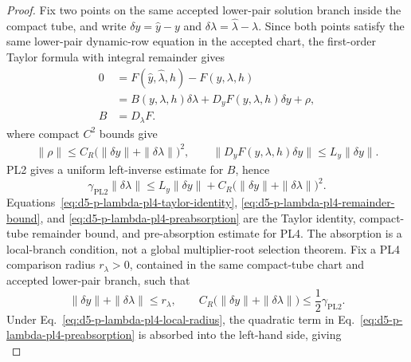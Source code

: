\documentclass[preprint,12pt]{elsarticle}
\begin{document}
\begin{proof}
Fix two points on the same accepted lower-pair solution branch inside the
compact tube, and write
\(\delta y=\widehat y-y\) and
\(\delta\lambda=\widehat\lambda-\lambda\).  Since both points satisfy the
same lower-pair dynamic-row equation in the accepted chart, the first-order
Taylor formula with integral remainder gives
\begin{equation}
\label{eq:d5-p-lambda-pl4-taylor-identity}
\begin{aligned}
  0
  &=F(\widehat y,\widehat\lambda,h)-F(y,\lambda,h)\\
  &=B(y,\lambda,h)\delta\lambda
    +D_yF(y,\lambda,h)\delta y+\rho,\\
  B&=D_{\lambda}F .
\end{aligned}
\end{equation}
where compact \(C^2\) bounds give
\begin{equation}
\label{eq:d5-p-lambda-pl4-remainder-bound}
\begin{aligned}
  \|\rho\|
  \le C_R\bigl(\|\delta y\|+\|\delta\lambda\|\bigr)^2,
  \qquad
  \|D_yF(y,\lambda,h)\delta y\|\le L_y\|\delta y\|.
\end{aligned}
\end{equation}
PL2 gives a uniform left-inverse estimate for \(B\), hence
\begin{equation}
\label{eq:d5-p-lambda-pl4-preabsorption}
  \gamma_{\mathrm{PL2}}\|\delta\lambda\|
  \le L_y\|\delta y\|
     +C_R\bigl(\|\delta y\|+\|\delta\lambda\|\bigr)^2 .
\end{equation}
Equations~\eqref{eq:d5-p-lambda-pl4-taylor-identity},
\eqref{eq:d5-p-lambda-pl4-remainder-bound}, and
\eqref{eq:d5-p-lambda-pl4-preabsorption} are the Taylor identity,
compact-tube remainder bound, and pre-absorption estimate for PL4.
The absorption is a local-branch condition, not a global multiplier-root
selection theorem.  Fix a PL4 comparison radius \(r_{\lambda}>0\), contained
in the same compact-tube chart and accepted lower-pair branch, such that
\begin{equation}
\label{eq:d5-p-lambda-pl4-local-radius}
  \|\delta y\|+\|\delta\lambda\|\le r_{\lambda},
  \qquad
  C_R\bigl(\|\delta y\|+\|\delta\lambda\|\bigr)
  \le \frac{1}{2}\gamma_{\mathrm{PL2}} .
\end{equation}
Under Eq.~\eqref{eq:d5-p-lambda-pl4-local-radius}, the quadratic term in
Eq.~\eqref{eq:d5-p-lambda-pl4-preabsorption} is absorbed into the left-hand
side, giving
\begin{equation}

\end{equation}
\end{proof}
\end{document}
